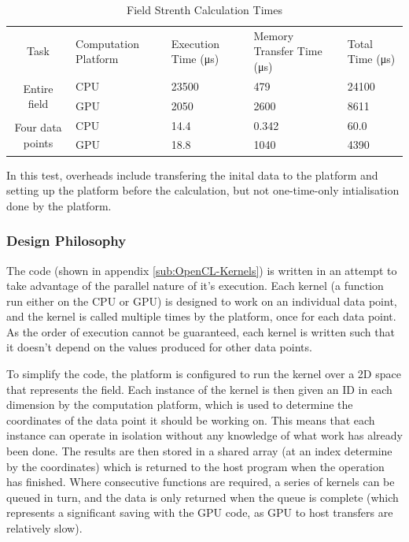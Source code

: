 \documentclass[10pt]{article}
\begin{document}
\begin{singlespace}
\begin{table}
\centering%
\begin{tabular}{|c|m{2cm}|p{2cm}|p{3cm}|m{2cm}|}
\hline
\multirow{2}{*}{Task} & \multirow{2}{3cm}{Computation Platform} &
\multirow{2}{2cm}{Execution Time (\si{\micro\second})} &
\multirow{2}{3cm}{Memory Transfer Time (\si{\micro\second})} &
\multirow{2}{1.8cm}{Total Time (\si{\micro\second})} \\
 &  &  &  & \\
\hline
\multirow{2}{*}{Entire field} & \ac{CPU} & \num{23500} & \num{479} & \num{24100}
\\
\cline{2-5}
 & \ac{GPU} & \num{2050} & \num{2600} & \num{8611} \\
\hline
\multirow{2}{*}{Four data points} & \ac{CPU} & \num{14.4} & \num{0.342} &
\num{60.0}
\\
\cline{2-5}
 & \ac{GPU} & \num{18.8} & \num{1040} & \num{4390} \\
\hline
\end{tabular}

In this test, overheads include transfering the inital data to the platform and
setting up the platform before the calculation, but not one-time-only
intialisation done by the platform.

\caption{Field Strenth Calculation Times\label{tab:Field-Strenth-Calculation}}
\end{table}

\end{singlespace}

\subsubsection{Design Philosophy}

The code (shown in appendix \ref{sub:OpenCL-Kernels}) is written in an attempt
to take advantage of the parallel nature of it's execution. Each kernel (a
function run either on the \ac{CPU} or \ac{GPU}) is designed to work on an
individual data point, and the kernel is called multiple times by the platform,
once for each data point. As the order of execution cannot be guaranteed, each
kernel is written such that it doesn't depend on the values produced for other
data points.

To simplify the code, the platform is configured to run the kernel over a 2D
space that represents the field. Each instance of the kernel is then given an ID
in each dimension by the computation platform, which is used to determine the
coordinates of the data point it should be working on. This means that each
instance can operate in isolation without any knowledge of what work has already
been done. The results are then stored in a shared array (at an index determine
by the coordinates) which is returned to the host program when the operation has
finished. Where consecutive functions are required, a series of kernels can be
queued in turn, and the data is only returned when the queue is complete
(which represents a significant saving with the \ac{GPU} code, as \ac{GPU} to
host transfers are relatively slow).
\end{document}

